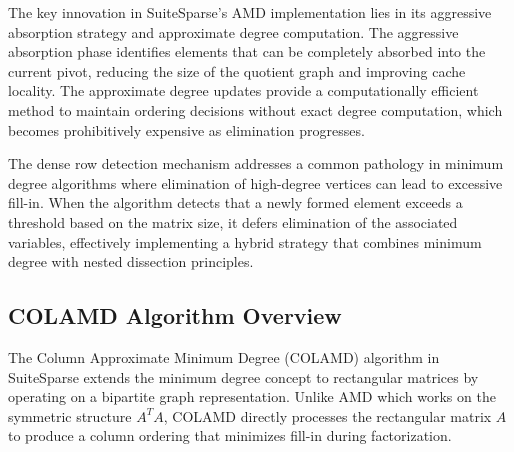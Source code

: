 The key innovation in SuiteSparse's AMD implementation lies in its aggressive absorption strategy and approximate degree computation. The aggressive absorption phase identifies elements that can be completely absorbed into the current pivot, reducing the size of the quotient graph and improving cache locality. The approximate degree updates provide a computationally efficient method to maintain ordering decisions without exact degree computation, which becomes prohibitively expensive as elimination progresses.

The dense row detection mechanism addresses a common pathology in minimum degree algorithms where elimination of high-degree vertices can lead to excessive fill-in. When the algorithm detects that a newly formed element exceeds a threshold based on the matrix size, it defers elimination of the associated variables, effectively implementing a hybrid strategy that combines minimum degree with nested dissection principles.

\subsection{COLAMD Algorithm Overview}

The Column Approximate Minimum Degree (COLAMD) algorithm in SuiteSparse extends the minimum degree concept to rectangular matrices by operating on a bipartite graph representation. Unlike AMD which works on the symmetric structure $A^T A$, COLAMD directly processes the rectangular matrix $A$ to produce a column ordering that minimizes fill-in during factorization.

